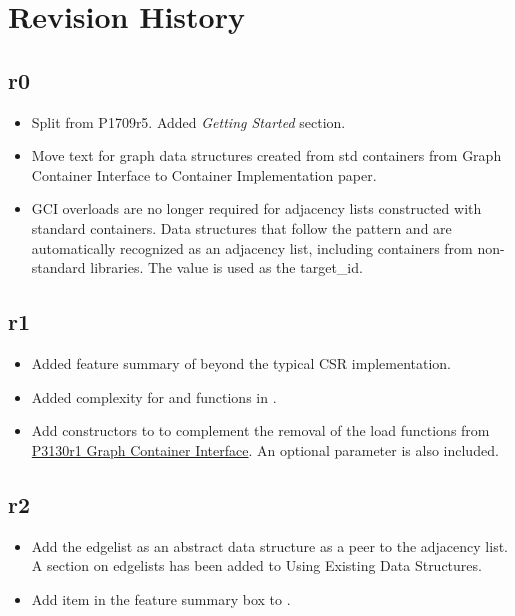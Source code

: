\section{Revision History}

\subsection*{\paperno r0}

\begin{itemize}
      \item Split from P1709r5. Added \textit{Getting Started} section.
      \item Move text for graph data structures created from std containers from Graph Container Interface to 
            Container Implementation paper.
      \item GCI overloads are no longer required for adjacency lists constructed with standard containers. Data structures that follow
            the pattern  and 
            are automatically recognized as an adjacency list, including containers from non-standard libraries. The 
            value is used as the target\_id.
\end{itemize}

\subsection*{\paperno r1}
\begin{itemize}
      \item Added feature summary of  beyond the typical CSR implementation.
      \item Added complexity for  and  functions in .
      \item Add constructors to  to complement the removal of the load functions from 
            \href{https://www.wg21.link/P3130r1}{P3130r1 Graph Container Interface}. An optional  
            parameter is also included.
\end{itemize}

\subsection*{\paperno r2}

\begin{itemize}
      \item Add the edgelist as an abstract data structure as a peer to the adjacency list. 
            A section on edgelists has been added to Using Existing Data Structures.
      \item Add  item in the feature summary box to .
\end{itemize}

